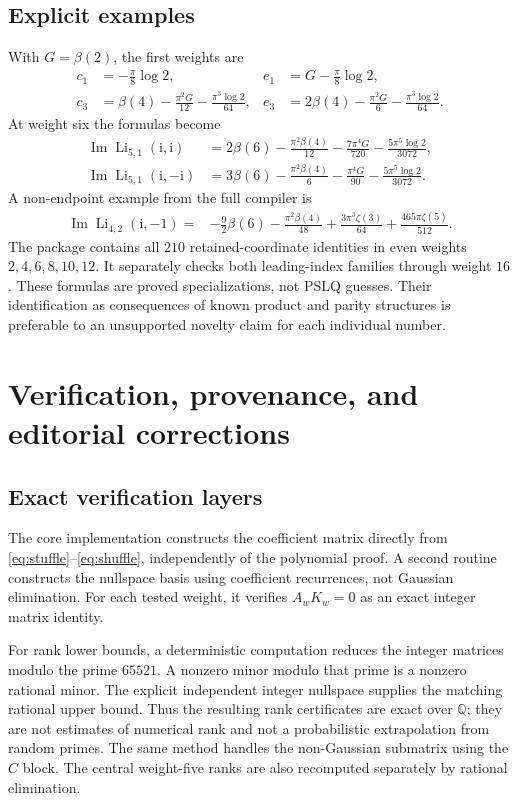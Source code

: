 \documentclass[11pt,a4paper]{article}
\numberwithin{equation}{section}
\theoremstyle{definition}\newtheorem{definition}[theorem]{Definition}
\theoremstyle{remark}\newtheorem{remark}[theorem]{Remark}
\newcommand{\Q}{\mathbb Q}
\newcommand{\ii}{\mathrm i}
\newcommand{\Li}{\operatorname{Li}}
\newcommand{\Imag}{\operatorname{Im}}
\begin{document}
\subsection{Explicit examples}
With $G=\beta(2)$, the first weights are
\begin{align*}
c_1&=-\frac\pi8\log2,&e_1&=G-\frac\pi8\log2,\\
c_3&=\beta(4)-\frac{\pi^2G}{12}-\frac{\pi^3\log2}{64},&
e_3&=2\beta(4)-\frac{\pi^2G}{6}-\frac{\pi^3\log2}{64}.
\end{align*}
At weight six the formulas become
\begin{align}
\Imag\Li_{5,1}(\ii,\ii)
 &=2\beta(6)-\frac{\pi^2\beta(4)}{12}
   -\frac{7\pi^4G}{720}-\frac{5\pi^5\log2}{3072},\label{eq:c5}\\
\Imag\Li_{5,1}(\ii,-\ii)
 &=3\beta(6)-\frac{\pi^2\beta(4)}6
   -\frac{\pi^4G}{90}-\frac{5\pi^5\log2}{3072}.\label{eq:e5}
\end{align}
A non-endpoint example from the full compiler is
\begin{align}
\Imag\Li_{4,2}(\ii,-1)
={}&-\frac92\beta(6)-\frac{\pi^2\beta(4)}{48}
 +\frac{3\pi^3\zeta(3)}{64}+\frac{465\pi\zeta(5)}{512}.
\label{eq:d42}
\end{align}
The package contains all $210$ retained-coordinate identities in even weights
$2,4,6,8,10,12$. It separately checks both leading-index families through
weight $16$. These formulas are proved specializations, not PSLQ guesses.
Their identification as consequences of known product and parity structures
is preferable to an unsupported novelty claim for each individual number.

\section{Verification, provenance, and editorial corrections}
\label{sec:verification}
\subsection{Exact verification layers}
The core implementation constructs the coefficient matrix directly from
\eqref{eq:stuffle}--\eqref{eq:shuffle}, independently of the polynomial proof.
A second routine constructs the nullspace basis using coefficient recurrences,
not Gaussian elimination. For each tested weight, it verifies $A_wK_w=0$
as an exact integer matrix identity.

For rank lower bounds, a deterministic computation reduces the integer
matrices modulo the prime $65521$. A nonzero minor modulo that prime is a
nonzero rational minor. The explicit independent integer nullspace supplies
the matching rational upper bound. Thus the resulting rank certificates are
exact over $\Q$; they are not estimates of numerical rank and not a
probabilistic extrapolation from random primes. The same method handles the
non-Gaussian submatrix using the $C$ block. The central weight-five ranks are
also recomputed separately by rational elimination.
\end{document}
